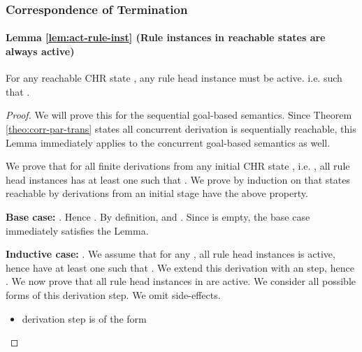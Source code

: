\documentclass{tlp}
\begin{document}
\subsubsection{Correspondence of Termination}

\paragraph{\bf Lemma \ref{lem:act-rule-inst} (Rule instances in reachable states are always active)}
For any reachable CHR state , any rule head instance  must be active.
i.e.  such that .

\begin{proof}
   We will prove this for the sequential goal-based semantics. Since Theorem \ref{theo:corr-par-trans}
   states all concurrent derivation is sequentially reachable, this Lemma immediately applies to the
   concurrent goal-based semantics as well.
   
   We prove that for all finite  derivations from any initial CHR state ,
   i.e. , all rule head instances 
   has at least one  such that . We prove by induction on  that states
   reachable by  derivations from an initial stage have the above property.
   
   {\bf Base case:} . Hence . By definition,
    and . Since  is empty, the base case immediately satisfies the Lemma.
   
   {\bf Inductive case:} . We assume that for any ,
   all rule head instances  is active, hence have at least one  such that
   . We extend this derivation with an  step, hence 
   .
   We now prove that all rule head instances in  are active. We consider all possible
   forms of this  derivation step. We omit side-effects.
   
  \begin{itemize}
	  \item {}  derivation step is of the form 
	        

\end{itemize}
\end{proof}
\end{document}
